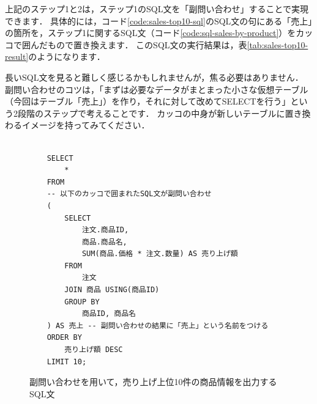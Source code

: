 上記のステップ1と2は，ステップ1のSQL文を「副問い合わせ」することで実現できます．
具体的には，コード\ref{code:sales-top10-sql}のSQL文の句にある「売上」の箇所を，ステップ1に関するSQL文（コード\ref{code:sql-sales-by-product}）をカッコ\graybox{( )}で囲んだもので置き換えます．
このSQL文の実行結果は，表\ref{tab:sales-top10-result}のようになります．

長いSQL文を見ると難しく感じるかもしれませんが，焦る必要はありません．
副問い合わせのコツは，「まずは必要なデータがまとまった小さな仮想テーブル（今回はテーブル「売上」）を作り，それに対して改めてSELECTを行う」という2段階のステップで考えることです．
カッコ\graybox{( )}の中身が新しいテーブルに置き換わるイメージを持ってみてください．
\begin{figure}[!htbp]
    \begin{verbatim}

    SELECT
        *
    FROM
    -- 以下のカッコで囲まれたSQL文が副問い合わせ
    (
        SELECT
            注文.商品ID,
            商品.商品名,
            SUM(商品.価格 * 注文.数量) AS 売り上げ額
        FROM
            注文
        JOIN 商品 USING(商品ID)
        GROUP BY
            商品ID, 商品名
    ) AS 売上 -- 副問い合わせの結果に「売上」という名前をつける
    ORDER BY
        売り上げ額 DESC
    LIMIT 10;

    \end{verbatim}
    \captionsetup{name=コード}
    \caption{副問い合わせを用いて，売り上げ上位10件の商品情報を出力するSQL文}
    \label{code:subquery-sales-top10}
\end{figure}

\begin{table}[!htbp]
    \centering
    \caption{副問い合わせを用いて，売り上げ上位10件の商品情報を出力するSQL文の実行結果}
    \label{tab:sales-top10-result}
\end{table}

